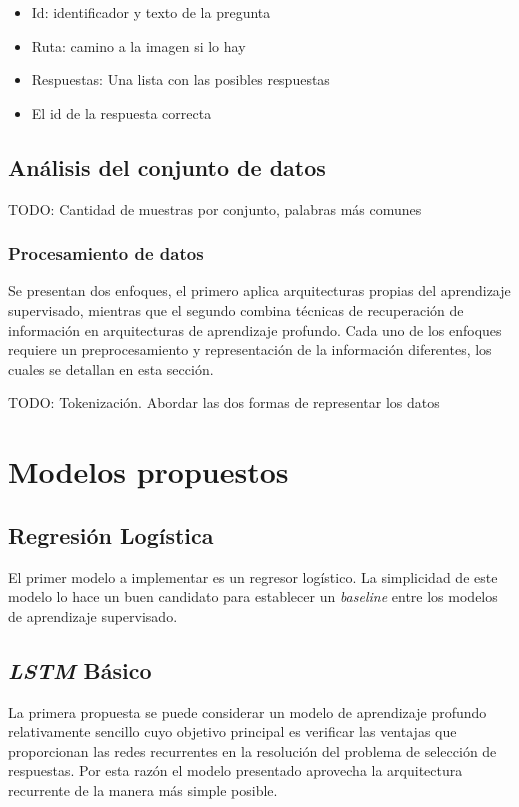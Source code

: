 \begin{itemize}
  \item Id: identificador y texto de la pregunta
  \item Ruta: camino a la imagen si lo hay
  \item Respuestas: Una lista con las posibles respuestas
  \item El id de la respuesta correcta
\end{itemize}


\section{Análisis del conjunto de datos}

TODO: Cantidad de muestras por conjunto, palabras más comunes


\subsection{Procesamiento de datos}

Se presentan dos enfoques, el primero aplica arquitecturas propias del aprendizaje supervisado, mientras que el segundo combina técnicas de recuperación de información en arquitecturas de aprendizaje profundo. Cada uno de los enfoques requiere un preprocesamiento y representación de la información diferentes, los cuales se detallan en esta sección.

TODO: Tokenización. Abordar las dos formas de representar los datos


\chapter{Modelos propuestos}\label{chapter:models}

\section{Regresión Logística}

El primer modelo a implementar es un regresor logístico. La simplicidad de este modelo lo hace un buen candidato para establecer un \textit{baseline} entre los modelos de aprendizaje supervisado.


\section{\textit{LSTM} Básico}\label{lstm_t}

La primera propuesta se puede considerar un modelo de aprendizaje profundo relativamente sencillo cuyo objetivo principal es verificar las ventajas que proporcionan las redes recurrentes en la resolución del problema de selección de respuestas. Por esta razón el modelo presentado aprovecha la arquitectura recurrente de la manera más simple posible.

